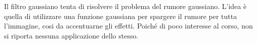 \documentclass{subfiles}
\begin{document}
Il filtro gaussiano tenta di risolvere il problema del rumore gaussiano.
L'idea è quella di utilizzare una funzione gaussiana per spargere il rumore per tutta l'immagine, cosi da accentuarne gli effetti.
Poiché di poco interesse al corso, non si riporta nessuna applicazione dello stesso.
\end{document}
